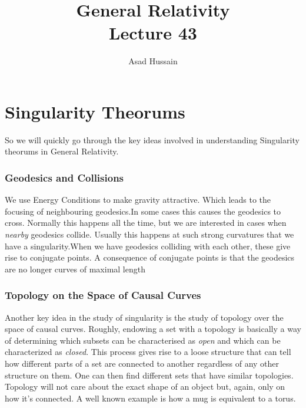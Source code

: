 \documentclass[10pt]{article}
\title{{\Huge General Relativity}\\{\Large{Lecture 43}}} %
\author{Asad Hussain}
\begin{document}
    \maketitle
    \flushbottom
    \newpage
    \pagestyle{fancynotes}
    \part{Singularity Theorums}
    
    So we will quickly go through the key ideas involved in understanding Singularity theorums in General Relativity. 
    
\section{Geodesics and Collisions}
We use Energy Conditions to make gravity attractive. Which leads to the focusing of neighbouring geodesics.In some cases this causes the geodesics to cross. Normally this happens all the time, but we are interested in cases when \textit{nearby} geodesics collide. Usually this happens at such strong curvatures that we have a singularity.When we have geodesics colliding with each other, these give rise to conjugate points. A consequence of conjugate points is that the geodesics are no longer curves of maximal length
  
\section{Topology on the Space of Causal Curves}
Another key idea in the study of singularity is the study of topology over the space of causal curves. Roughly, endowing a set with a topology is basically a way of determining which subsets can be characterised as \textit{open} and which can be characterized as \textit{closed}. This process gives rise to a loose structure that can tell how different parts of a set are connected to another regardless of any other structure on them. One can then find different sets that have similar topologies. Topology will not care about the exact shape of an object but, again, only on how it's connected.  A well known example is how a mug is equivalent to a torus. 
\end{document}
